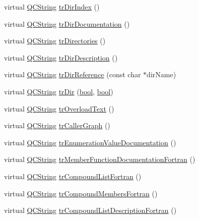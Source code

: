 \begin{DoxyCompactItemize}
\item 
virtual \hyperlink{class_q_c_string}{Q\+C\+String} \hyperlink{class_translator_japanese_a027c07f499a03ce03ad158c869115472}{tr\+Dir\+Index} ()
\item 
virtual \hyperlink{class_q_c_string}{Q\+C\+String} \hyperlink{class_translator_japanese_a9e9000357236606370551cd6e26ed037}{tr\+Dir\+Documentation} ()
\item 
virtual \hyperlink{class_q_c_string}{Q\+C\+String} \hyperlink{class_translator_japanese_a060115ae997a9bc3bbc7191d0dddbaea}{tr\+Directories} ()
\item 
virtual \hyperlink{class_q_c_string}{Q\+C\+String} \hyperlink{class_translator_japanese_a532fd52072df57839b31a51c58b0a5f7}{tr\+Dir\+Description} ()
\item 
virtual \hyperlink{class_q_c_string}{Q\+C\+String} \hyperlink{class_translator_japanese_a41232a3dc6ce64ac8552cf18e4e26977}{tr\+Dir\+Reference} (const char $\ast$dir\+Name)
\item 
virtual \hyperlink{class_q_c_string}{Q\+C\+String} \hyperlink{class_translator_japanese_a08f91c6cd462e77469139a47f04777c7}{tr\+Dir} (\hyperlink{qglobal_8h_a1062901a7428fdd9c7f180f5e01ea056}{bool}, \hyperlink{qglobal_8h_a1062901a7428fdd9c7f180f5e01ea056}{bool})
\item 
virtual \hyperlink{class_q_c_string}{Q\+C\+String} \hyperlink{class_translator_japanese_a2b504f1eeebf18f26ed6c6696432e178}{tr\+Overload\+Text} ()
\item 
virtual \hyperlink{class_q_c_string}{Q\+C\+String} \hyperlink{class_translator_japanese_a954ec2b6811c3c9e02023be9ed7c0f15}{tr\+Caller\+Graph} ()
\item 
virtual \hyperlink{class_q_c_string}{Q\+C\+String} \hyperlink{class_translator_japanese_af07831d86b7a4f50b7fd3133cec19435}{tr\+Enumeration\+Value\+Documentation} ()
\item 
virtual \hyperlink{class_q_c_string}{Q\+C\+String} \hyperlink{class_translator_japanese_a771a6eff68529e84c4a7d45dcf275ce1}{tr\+Member\+Function\+Documentation\+Fortran} ()
\item 
virtual \hyperlink{class_q_c_string}{Q\+C\+String} \hyperlink{class_translator_japanese_a2584089d5a59af148ae40bf306e01453}{tr\+Compound\+List\+Fortran} ()
\item 
virtual \hyperlink{class_q_c_string}{Q\+C\+String} \hyperlink{class_translator_japanese_a33ef8b96e715216da5a944f4cd64d254}{tr\+Compound\+Members\+Fortran} ()
\item 
virtual \hyperlink{class_q_c_string}{Q\+C\+String} \hyperlink{class_translator_japanese_ac53f12f510b4b1919134719b58ff5e30}{tr\+Compound\+List\+Description\+Fortran} ()

\end{DoxyCompactItemize}
